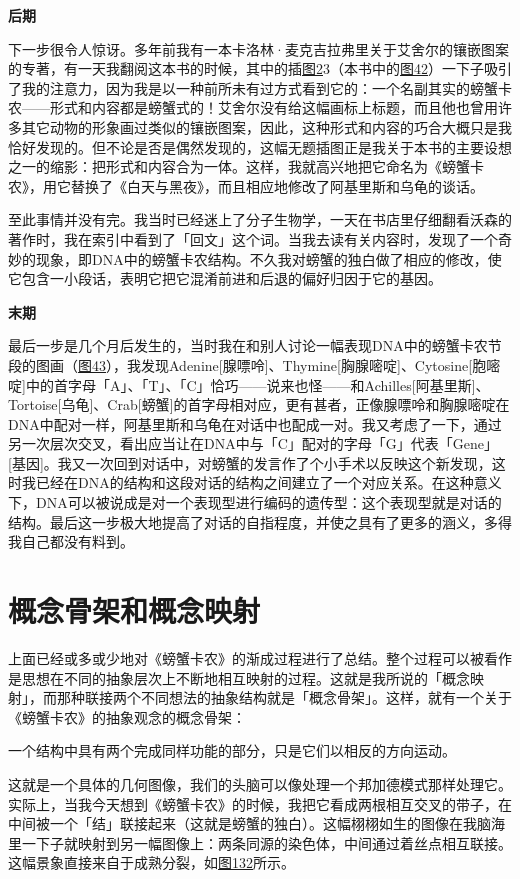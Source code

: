 \documentclass[
  12pt,
  twoside,
  openright,
  oldfontcommands,
]{memoir}
\begin{document}
\textbf{后期}

下一步很令人惊讶。多年前我有一本卡洛林·麦克吉拉弗里关于艾舍尔的镶嵌图案的专著，有一天我翻阅这本书的时候，其中的插\hyperref[fig:2]{图2}3（本书中的\hyperref[fig:42]{图42}）一下子吸引了我的注意力，因为我是以一种前所未有过方式看到它的：一个名副其实的螃蟹卡农------形式和内容都是螃蟹式的！艾舍尔没有给这幅画标上标题，而且他也曾用许多其它动物的形象画过类似的镶嵌图案，因此，这种形式和内容的巧合大概只是我恰好发现的。但不论是否是偶然发现的，这幅无题插图正是我关于本书的主要设想之一的缩影：把形式和内容合为一体。这样，我就高兴地把它命名为《螃蟹卡农》，用它替换了《白天与黑夜》，而且相应地修改了阿基里斯和乌龟的谈话。

至此事情并没有完。我当时已经迷上了分子生物学，一天在书店里仔细翻看沃森的著作时，我在索引中看到了「回文」这个词。当我去读有关内容时，发现了一个奇妙的现象，即DNA中的螃蟹卡农结构。不久我对螃蟹的独白做了相应的修改，使它包含一小段话，表明它把它混淆前进和后退的偏好归因于它的基因。

\textbf{末期}

最后一步是几个月后发生的，当时我在和别人讨论一幅表现DNA中的螃蟹卡农节段的图画（\hyperref[fig:43]{图43}），我发现Adenine{[}腺嘌呤{]}、Thymine{[}胸腺嘧啶{]}、Cytosine{[}胞嘧啶{]}中的首字母「A」、「T」、「C」恰巧------说来也怪------和Achilles{[}阿基里斯{]}、Tortoise{[}乌龟{]}、Crab{[}螃蟹{]}的首字母相对应，更有甚者，正像腺嘌呤和胸腺嘧啶在DNA中配对一样，阿基里斯和乌龟在对话中也配成一对。我又考虑了一下，通过另一次层次交叉，看出应当让在DNA中与「C」配对的字母「G」代表「Gene」{[}基因{]}。我又一次回到对话中，对螃蟹的发言作了个小手术以反映这个新发现，这时我已经在DNA的结构和这段对话的结构之间建立了一个对应关系。在这种意义下，DNA可以被说成是对一个表现型进行编码的遗传型：这个表现型就是对话的结构。最后这一步极大地提高了对话的自指程度，并使之具有了更多的涵义，多得我自己都没有料到。

\section{概念骨架和概念映射}

上面已经或多或少地对《螃蟹卡农》的渐成过程进行了总结。整个过程可以被看作是思想在不同的抽象层次上不断地相互映射的过程。这就是我所说的「概念映射」，而那种联接两个不同想法的抽象结构就是「概念骨架」。这样，就有一个关于《螃蟹卡农》的抽象观念的概念骨架：

{一个结构中具有两个完成同样功能的部分，只是它们以相反的方向运动。}

这就是一个具体的几何图像，我们的头脑可以像处理一个邦加德模式那样处理它。实际上，当我今天想到《螃蟹卡农》的时候，我把它看成两根相互交叉的带子，在中间被一个「结」联接起来（这就是螃蟹的独白）。这幅栩栩如生的图像在我脑海里一下子就映射到另一幅图像上：两条同源的染色体，中间通过着丝点相互联接。这幅景象直接来自于成熟分裂，如\hyperref[fig:132]{图132}所示。
\end{document}

